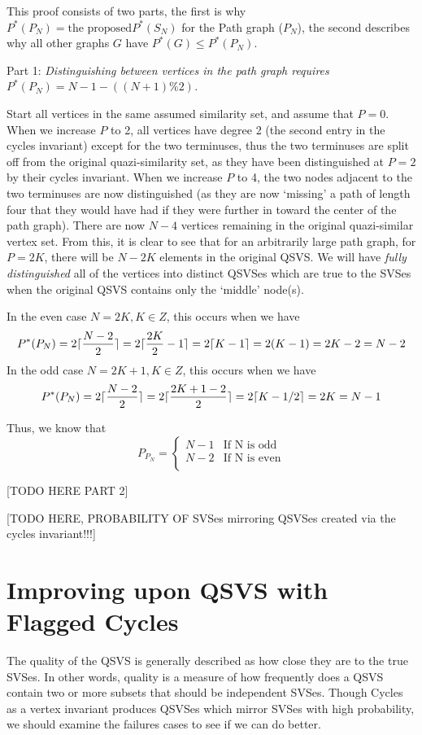 This proof consists of two parts, the first is why $P^*(P_N) = \text{the proposed} P^*(S_N)$ for the Path graph ($P_N$), the second describes why all other graphs $G$ have $P^*(G) \leq P^*(P_N)$.

Part 1: \emph{Distinguishing between vertices in the path graph requires $P^*(P_N) = N - 1 - ((N+1)\%2)$.}

Start all vertices in the same assumed similarity set, and assume that $P = 0$.
When we increase $P$ to 2, all vertices have degree 2 (the second entry in the cycles invariant) except for the two terminuses, thus the two terminuses are split off from the original quazi-similarity set, as they have been distinguished at $P=2$ by their cycles invariant.
When we increase $P$ to 4, the two nodes adjacent to the two terminuses are now distinguished (as they are now `missing' a path of length four that they would have had if they were further in toward the center of the path graph). 
There are now $N-4$ vertices remaining in the original quazi-similar vertex set.
From this, it is clear to see that for an arbitrarily large path graph, for $P=2K$, there will be $N-2K$ elements in the original QSVS.
We will have \emph{fully distinguished} all of the vertices into distinct QSVSes which are true to the SVSes when the original QSVS contains only the `middle' node(s).

In the even case $N = 2K, K \in Z$, this occurs when we have 
$$P^*(P_N) = 2\lceil\frac{N-2}{2}\rceil = 2\lceil\frac{2K}{2} - 1\rceil = 2\lceil K - 1\rceil = 2(K - 1) = 2K - 2 = N - 2$$
In the odd case $N = 2K +1, K \in Z$, this occurs when we have 
$$P^*(P_N) = 2\lceil\frac{N-2}{2}\rceil  = 2\lceil\frac{2K+1- 2}{2}\rceil = 2\lceil K - 1/2\rceil = 2K = N - 1 $$

Thus, we know that 
\[ P_{P_N} = \begin{cases} 
      N-1 & \text{If N is odd} \\
      N-2 & \text{If N is even} \\
   \end{cases}
\]

[TODO HERE PART 2]

[TODO HERE, PROBABILITY OF SVSes mirroring QSVSes created via the cycles invariant!!!]

\section{Improving upon QSVS with Flagged Cycles}

The quality of the QSVS is generally described as how close they are to the true SVSes.
In other words, quality is a measure of how frequently does a QSVS contain two or more subsets that should be independent SVSes.
Though Cycles as a vertex invariant produces QSVSes which mirror SVSes with high probability, we should examine the failures cases to see if we can do better.


